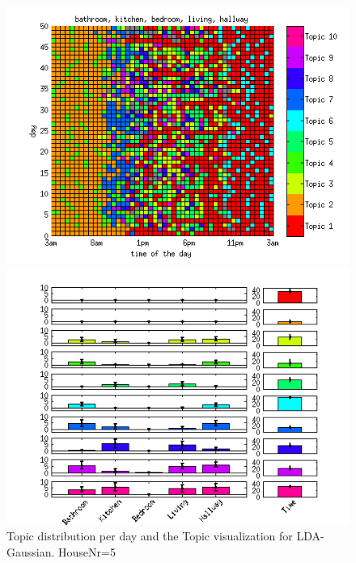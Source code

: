 \begin{figure}
 \centering
 \begin{minipage}[b]{0.45\linewidth}
  \centering
  \includegraphics[width=\textwidth]{Pictures/Gaus/DayHN5TS48k20.png}
 \end{minipage}
 \begin{minipage}[b]{0.45\linewidth}
  \centering
  \includegraphics[width=\textwidth]{Pictures/Gaus/TopHN5TS48k20.png}
 \end{minipage}
 \caption{Topic distribution per day and the Topic visualization for LDA-Gaussian. HouseNr=5}
\end{figure}

